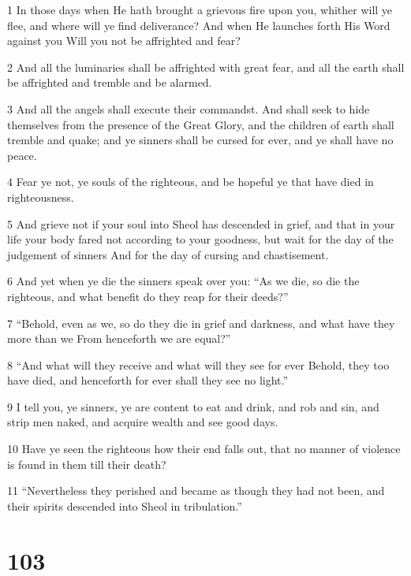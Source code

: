 \par 1 In those days when He hath brought a grievous fire upon you, whither will ye flee, and where will ye find deliverance? And when He launches forth His Word against you Will you not be affrighted and fear?
\par 2 And all the luminaries shall be affrighted with great fear, and all the earth shall be affrighted and tremble and be alarmed.
\par 3 And all the angels shall execute their commandst. And shall seek to hide themselves from the presence of the Great Glory, and the children of earth shall tremble and quake; and ye sinners shall be cursed for ever, and ye shall have no peace.
\par 4 Fear ye not, ye souls of the righteous, and be hopeful ye that have died in righteousness.
\par 5 And grieve not if your soul into Sheol has descended in grief, and that in your life your body fared not according to your goodness, but wait for the day of the judgement of sinners And for the day of cursing and chastisement.
\par 6 And yet when ye die the sinners speak over you: “As we die, so die the righteous, and what benefit do they reap for their deeds?”
\par 7 “Behold, even as we, so do they die in grief and darkness, and what have they more than we From henceforth we are equal?”
\par 8 “And what will they receive and what will they see for ever Behold, they too have died, and henceforth for ever shall they see no light.”
\par 9 I tell you, ye sinners, ye are content to eat and drink, and rob and sin, and strip men naked, and acquire wealth and see good days.
\par 10 Have ye seen the righteous how their end falls out, that no manner of violence is found in them till their death?
\par 11 “Nevertheless they perished and became as though they had not been, and their spirits descended into Sheol in tribulation.”

\chapter{103}

